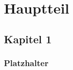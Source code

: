 \chapter{Hauptteil}
\label{chap:htl}

\section{Kapitel 1}
\label{sec:htl-k1}

\subsection{Platzhalter}
\label{sec:htl-k1-pl}